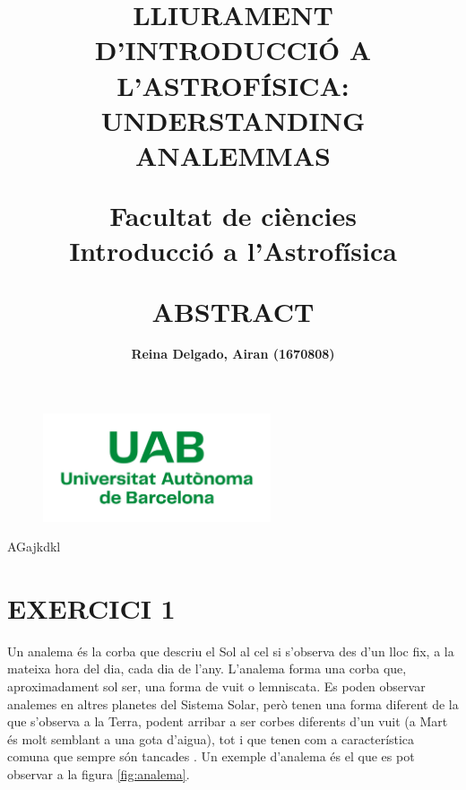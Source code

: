 \documentclass[a4paper, 11pt]{article}
\begin{document}
\begin{figure}
    \centering
    \includegraphics[width=0.6\textwidth]{images/Logo_uab.png}
    \label{uab}
\end{figure}

\title{{\textbf{\Large LLIURAMENT D'INTRODUCCIÓ A L'ASTROFÍSICA: UNDERSTANDING ANALEMMAS
}\\}

\vspace{12mm}

{\large Facultat de ciències}\\
{\large Introducció a l'Astrofísica}}

\author{\textbf{Reina Delgado, Airan (1670808)}}
\date{}


\maketitle

\vspace{30mm} \title{\textbf{\Large ABSTRACT}}



    \vspace{4mm} 
    \noindent AGajkdkl
    \newpage


\section*{EXERCICI 1}
\noindent Un analema és la corba que descriu el Sol al cel si s’observa des d'un lloc fix, a la mateixa hora del dia, cada dia de l’any. L’analema forma una corba que, aproximadament sol ser, una forma de vuit o lemniscata. Es poden observar analemes en altres planetes del Sistema Solar, però tenen una forma diferent de la que s’observa a la Terra, podent arribar a ser corbes diferents d’un vuit (a Mart és molt semblant a una gota d’aigua), tot i que tenen com a característica comuna que sempre són tancades \cite{DEFINICIO_ANALEMA}. Un exemple d’analema és el que es pot observar a la figura \ref{fig:analema}.
\end{document}
